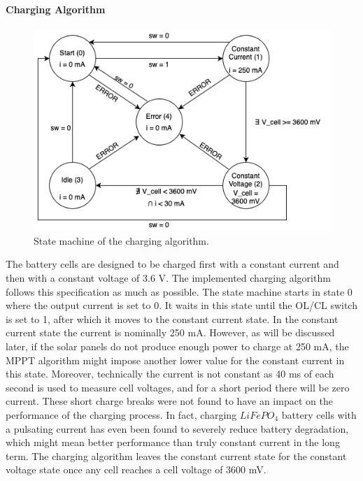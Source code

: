 \documentclass[a4paper]{article}
\begin{document}
\paragraph*{Charging Algorithm}
\vspace{-20pt} 
\begin{figure}[H]
	\centering
    \includegraphics[scale=0.5]{State_diagram.png}
    \caption{State machine of the charging algorithm.}
\end{figure}
\vspace{-20pt}
The battery cells are designed to be charged first with a constant current and then 
with a constant voltage of 3.6 V\cite{batteryDatasheet}. The implemented charging 
algorithm follows this specification as much as possible. The state machine starts 
in state 0 where the output current is set to 0. It waits in this state until the 
OL/CL switch is set to 1, after which it moves to the constant current state. 
In the constant current state the current is nominally 
250 mA. However, as will be discussed later, if the solar panels do not produce enough
power to charge at 250 mA, the MPPT algorithm might impose another lower value for 
the constant current in this state. Moreover, technically the current is not 
constant as 40 ms of each second is used to measure cell voltages, and for a 
short period there will be zero current. These short charge breaks were not found 
to have an impact on the performance of the charging process. In fact, 
charging $LiFePO_{4}$ battery cells with a pulsating current has even been 
found to severely reduce battery degradation\cite{PulseCharging}, which might 
mean better performance than truly constant current in the long term. The 
charging algorithm leaves the constant current state for the constant voltage 
state once any cell reaches a cell voltage of 3600 mV.
\end{document}
